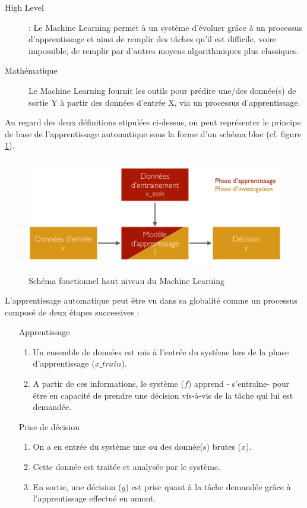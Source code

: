 \begin{description}
	\item[High Level]: Le Machine Learning permet à un système d'évoluer grâce à un processus d'apprentissage et ainsi de remplir des tâches qu'il est difficile, voire impossible, de remplir par d'autres moyens algorithmiques plus classiques. 
	\item[Mathématique] Le Machine Learning fournit les outils pour prédire une/des donnée(s) de sortie Y à partir des données d'entrée X, via un processus d'apprentissage. 
\end{description}
 
Au regard des deux définitions stipulées ci-dessus, on peut représenter le principe de base de l'apprentissage automatique sous la forme d'un schéma bloc (cf. figure \ref{fig:Schéma fonctionnel haut niveau du Machine Learning}).

\begin{figure}[h]
	\centering\includegraphics[height=5cm]{images/ML_high_level.png}
	\caption{Schéma fonctionnel haut niveau du Machine Learning}
	\label{fig:Schéma fonctionnel haut niveau du Machine Learning}
\end{figure}

L'apprentissage automatique peut être vu dans sa globalité comme un processus composé de deux étapes successives : 
\begin{enumerate}
		\item [Apprentissage]
		 \begin{enumerate}
			\item  Un ensemble de données est mis à l'entrée du système lors de la phase d'apprentissage ($x\_train$).
			\item A partir de ces informations, le système ($f$) apprend - s'entraîne- pour être en capacité de prendre une décision vis-à-vis de la tâche qui lui est demandée. 
		\end{enumerate}
		
		\item [Prise de décision] 
		\begin{enumerate}
			\item  On a en entrée du système une ou des donnée(s) brutes ($x$).  
			\item Cette donnée est traitée et analysée par le système.
			\item En sortie, une décision ($y$) est prise quant à la tâche demandée grâce à l'apprentissage effectué en amont. 
		\end{enumerate}
\end{enumerate}


